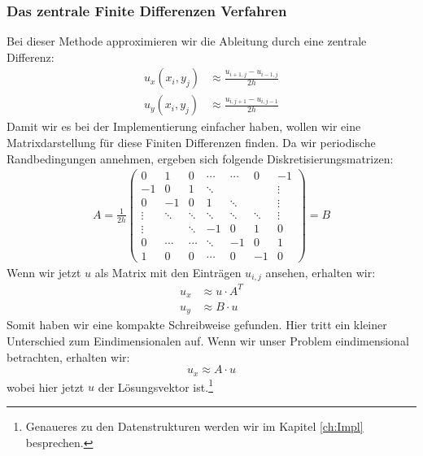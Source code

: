 \documentclass[12pt,a4paper]{scrartcl}
\numberwithin{equation}{section} %
\theoremstyle{definition}
\theoremstyle{plain}
\begin{document}
\subsubsection{Das zentrale Finite Differenzen Verfahren}
Bei dieser Methode approximieren wir die Ableitung durch eine zentrale Differenz:
\begin{align}
u_x(x_i,y_j)&\approx\frac{u_{i+1,j}-u_{i-1,j}}{2h}\\
u_y(x_i,y_j)&\approx\frac{u_{i,j+1}-u_{i,j-1}}{2h}
\end{align}
Damit wir es bei der Implementierung einfacher haben, wollen wir eine Matrixdarstellung für diese Finiten Differenzen finden. Da wir periodische Randbedingungen annehmen, ergeben sich folgende Diskretisierungsmatrizen:
\begin{align}
A=\frac{1}{2h}\begin{pmatrix}
0&1&0&\dotsb&\dotsb&0&-1\\
-1&0&1&\ddots&&&\vdots\\
0&-1&0&1&\ddots&&\vdots\\
\vdots&\ddots&\ddots&\ddots&\ddots&\ddots&\vdots\\
\vdots&&\ddots&-1&0&1&0\\
0&\dotsb&\dotsb&\ddots&-1&0&1\\
1&0&0&\dotsb&0&-1&0
\end{pmatrix}=B
\end{align}
Wenn wir jetzt $u$ als Matrix mit den Einträgen $u_{i,j}$ ansehen, erhalten wir:
\begin{align}
u_x&\approx u\cdot A^T\\
u_y&\approx B\cdot u
\end{align}
Somit haben wir eine kompakte Schreibweise gefunden. Hier tritt ein kleiner Unterschied zum Eindimensionalen auf. Wenn wir unser Problem eindimensional betrachten, erhalten wir:
\begin{equation}
u_x\approx A\cdot u
\end{equation}
wobei hier jetzt $u$ der Lösungsvektor ist.\footnote{Genaueres zu den Datenstrukturen werden wir im Kapitel \ref{ch:Impl} besprechen.}
\end{document}
